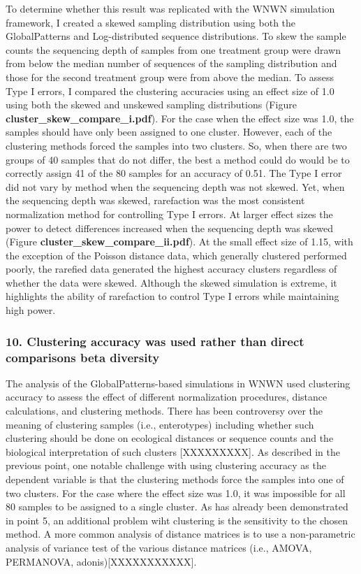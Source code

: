 \documentclass[
]{article}
\begin{document}
To determine whether this result was replicated with the WNWN simulation
framework, I created a skewed sampling distribution using both the
GlobalPatterns and Log-distributed sequence distributions. To skew the
sample counts the sequencing depth of samples from one treatment group
were drawn from below the median number of sequences of the sampling
distribution and those for the second treatment group were from above
the median. To assess Type I errors, I compared the clustering
accuracies using an effect size of 1.0 using both the skewed and
unskewed sampling distributions (Figure
\textbf{cluster\_skew\_compare\_i.pdf}). For the case when the effect
size was 1.0, the samples should have only been assigned to one cluster.
However, each of the clustering methods forced the samples into two
clusters. So, when there are two groups of 40 samples that do not
differ, the best a method could do would be to correctly assign 41 of
the 80 samples for an accuracy of 0.51. The Type I error did not vary by
method when the sequencing depth was not skewed. Yet, when the
sequencing depth was skewed, rarefaction was the most consistent
normalization method for controlling Type I errors. At larger effect
sizes the power to detect differences increased when the sequencing
depth was skewed (Figure \textbf{cluster\_skew\_compare\_ii.pdf}). At
the small effect size of 1.15, with the exception of the Poisson
distance data, which generally clustered performed poorly, the rarefied
data generated the highest accuracy clusters regardless of whether the
data were skewed. Although the skewed simulation is extreme, it
highlights the ability of rarefaction to control Type I errors while
maintaining high power.

\hypertarget{clustering-accuracy-was-used-rather-than-direct-comparisons-beta-diversity}{%
\subsubsection{10. Clustering accuracy was used rather than direct
comparisons beta
diversity}\label{clustering-accuracy-was-used-rather-than-direct-comparisons-beta-diversity}}

The analysis of the GlobalPatterns-based simulations in WNWN used
clustering accuracy to assess the effect of different normalization
procedures, distance calculations, and clustering methods. There has
been controversy over the meaning of clustering samples (i.e.,
enterotypes) including whether such clustering should be done on
ecological distances or sequence counts and the biological
interpretation of such clusters {[}XXXXXXXXX{]}. As described in the
previous point, one notable challenge with using clustering accuracy as
the dependent variable is that the clustering methods force the samples
into one of two clusters. For the case where the effect size was 1.0, it
was impossible for all 80 samples to be assigned to a single cluster. As
has already been demonstrated in point 5, an additional problem wiht
clustering is the sensitivity to the chosen method. A more common
analysis of distance matrices is to use a non-parametric analysis of
variance test of the various distance matrices (i.e., AMOVA, PERMANOVA,
adonis){[}XXXXXXXXXXX{]}.
\end{document}
